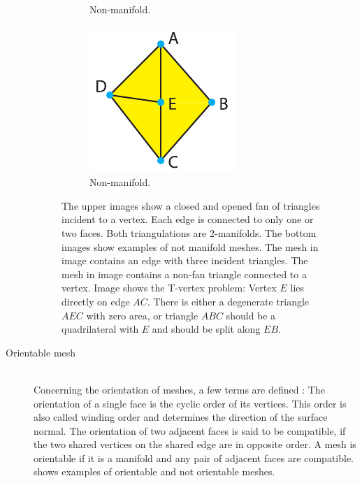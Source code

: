 \begin{description}
\begin{figure}[H]
\begin{subfigure}[t]{0.32\textwidth}
			\caption{
				Non-manifold.
			}
			\label{fig:non_manifold_vertex}
		\end{subfigure}
		\begin{subfigure}[t]{0.32\textwidth}
			\centering
			\includegraphics[width=\textwidth]{images/t_vertex}
			\caption{
				Non-manifold.
				}
			\label{fig:t_vertex}
		\end{subfigure}
		\caption{
			The upper images show a closed and opened fan of triangles incident to a vertex.
			Each edge is connected to only one or two faces.
			Both triangulations are 2-manifolds.
			The bottom images show examples of not manifold meshes.
			The mesh in image  contains an edge with three incident triangles.
			The mesh in image  contains a non-fan triangle connected to a vertex.
			Image  shows the T-vertex problem:
			Vertex $E$ lies directly on edge $AC$.
			There is either a degenerate triangle $AEC$ with zero area, or triangle $ABC$ should be a quadrilateral with $E$ and should be split along $EB$.
		}
		\label{fig:manifold}
	\end{figure}


	\item[Orientable mesh] \hfill \\
	Concerning the orientation of meshes, a few terms are defined \cite{mesh_basics}:
	The orientation of a single face is the cyclic order of its vertices.
	This order is also called winding order and determines the direction of the surface normal.
	The orientation of two adjacent faces is said to be compatible, if the two shared vertices on the shared edge are in opposite order.
	A mesh is orientable if it is a manifold and any pair of adjacent faces are compatible.
	 shows examples of orientable and not orientable meshes.


\end{description}

